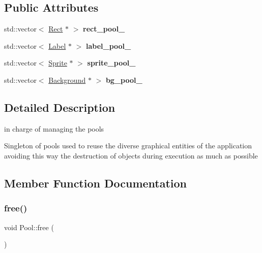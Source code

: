 \subsection*{Public Attributes}
\begin{DoxyCompactItemize}
\item 
\mbox{\label{class_pool_a2a73ee4005262cd6f4ebfc25a1811fce}} 
std\+::vector$<$ \hyperlink{class_rect}{Rect} $\ast$ $>$ {\bfseries rect\+\_\+pool\+\_\+}
\item 
\mbox{\label{class_pool_a5ea3bbd258fcb452dcfa036ac5acacd5}} 
std\+::vector$<$ \hyperlink{class_label}{Label} $\ast$ $>$ {\bfseries label\+\_\+pool\+\_\+}
\item 
\mbox{\label{class_pool_a0bd32066fb5351695261a6fa1f1796bf}} 
std\+::vector$<$ \hyperlink{class_sprite}{Sprite} $\ast$ $>$ {\bfseries sprite\+\_\+pool\+\_\+}
\item 
\mbox{\label{class_pool_a11e4e7ab2e2d9307e7ec5dd56ffc84ed}} 
std\+::vector$<$ \hyperlink{class_background}{Background} $\ast$ $>$ {\bfseries bg\+\_\+pool\+\_\+}
\end{DoxyCompactItemize}


\subsection{Detailed Description}
in charge of managing the pools

Singleton of pools used to reuse the diverse graphical entities of the application avoiding this way the destruction of objects during execution as much as possible 

\subsection{Member Function Documentation}
\mbox{\label{class_pool_aa2bcc7b11c5f0a438b1fe5405ba698ff}} 
\subsubsection{\texorpdfstring{free()}{free()}}
{\footnotesize\ttfamily void Pool\+::free (\begin{DoxyParamCaption}{ }\end{DoxyParamCaption})}

